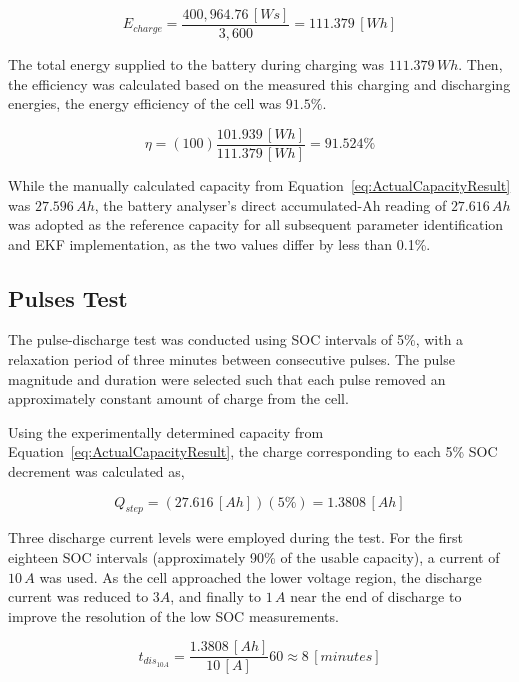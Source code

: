 \begin{equation}
    E_{charge} = \frac{400,964.76\,[Ws]}{3,600} = 111.379\,[Wh]
    \label{eq:EChargeDiscrete}
\end{equation}

The total energy supplied to the battery during charging was $111.379\,Wh$. Then, the efficiency was calculated 
based on the measured this charging and discharging energies, the energy efficiency of the cell was $91.5\%$.

\begin{equation}
    \eta = (100)\frac{101.939\,[Wh]}{111.379\,[Wh]} = 91.524\%
    \label{EtaEfficiency}
\end{equation}

While the manually calculated capacity from Equation~\eqref{eq:ActualCapacityResult} was $27.596\,Ah$, 
the battery analyser's direct accumulated-Ah reading of $27.616\,Ah$ was adopted as the reference capacity for 
all subsequent parameter identification and EKF implementation, as the two values differ by less than 0.1\%.

\subsection{Pulses Test}\label{PulsesTestsResults}
The pulse-discharge test was conducted using \ac{SOC} intervals of 5\%, with a relaxation period of three 
minutes between consecutive pulses. The pulse magnitude and duration were selected such that each 
pulse removed an approximately constant amount of charge from the cell.

Using the experimentally determined capacity from Equation~\eqref{eq:ActualCapacityResult}, the charge 
corresponding to each 5\% \ac{SOC} decrement was calculated as,

\begin{equation}
    Q_{step} = (27.616\,[Ah])(5\%) = 1.3808\,[Ah]
    \label{QStep}
\end{equation}

Three discharge current levels were employed during the test. For the first eighteen \ac{SOC} intervals 
(approximately 90\% of the usable capacity), a current of $10\,A$ was used. 
As the cell approached the lower voltage region, the discharge current was reduced to $3 A$, and 
finally to $1\,A$ near the end of discharge to improve the resolution of the low \ac{SOC} measurements.

\begin{equation}
    t_{dis_{10A}} = \frac{1.3808\,[Ah]}{10\,[A]} 60 \approx 8\,[minutes]
\end{equation}

